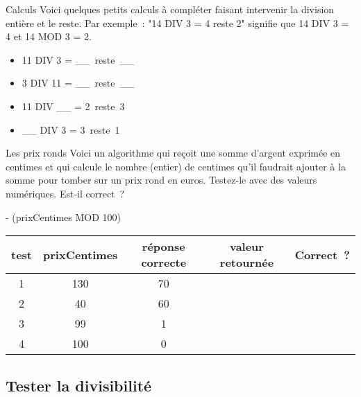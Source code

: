 			\begin{Exercice}{Calculs}
				Voici quelques petits calculs à compléter
				faisant intervenir la division entière et le reste.
				Par exemple~: "14 DIV 3 = 4 reste 2"
				signifie que 14 DIV 3 = 4 et 14 MOD 3 = 2.
				
				\begin{multicols}{2}
					\begin{itemize}
					\item 11 DIV 3 = \_\_\ reste\ \_\_
					\item 3 DIV 11 = \_\_\ reste\ \_\_
					\item 11 DIV \_\_ = 2\ reste\ 3
					\item \_\_ DIV 3 = 3\ reste\ 1
					\end{itemize}
				\end{multicols}
			\end{Exercice}

			\begin{Exercice}{Les prix ronds}
				Voici un algorithme qui reçoit une somme d’argent exprimée en centimes
				et qui calcule le nombre (entier) de centimes qu’il
				faudrait ajouter à la somme pour tomber sur un prix rond en euros.
				Testez-le avec des valeurs numériques. Est-il correct~?
				
				\begin{LDA}
					 - (prixCentimes MOD 100)
				\EndAlgo
				\end{LDA}
				
				\begin{center}
				\begin{tabular}{|c|c|c|c|c|}
				\hline
				test \no & prixCentimes & réponse correcte & valeur retournée & Correct~? \\\hline
				\hline 
				1 & 130 & 70 &  & \\\hline
				2 & 40  & 60 &  & \\\hline
				3 & 99  & 1  &  & \\\hline
				4 & 100 & 0  &  & \\\hline
				\end{tabular}
				\end{center}
				
			\end{Exercice}
			
			
		\subsection{Tester la divisibilité}
		
